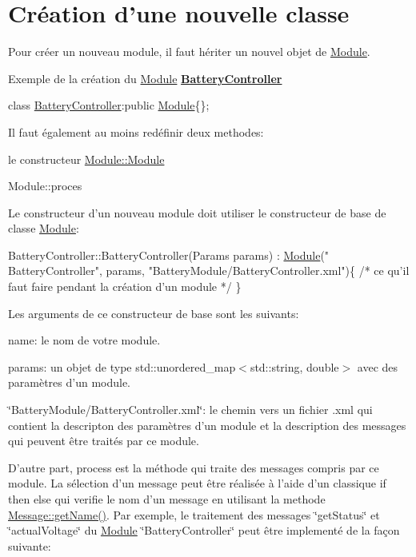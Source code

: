 \hypertarget{docModule_classCreation}{}\section{Création d'une nouvelle classe}\label{docModule_classCreation}
Pour créer un nouveau module, il faut hériter un nouvel objet de \hyperlink{classModule}{Module}.

Exemple de la création du \hyperlink{classModule}{Module} {\bfseries \hyperlink{classBatteryController}{Battery\-Controller}}

{\ttfamily class \hyperlink{classBatteryController}{Battery\-Controller}\-:public \hyperlink{classModule}{Module}\{\};}

Il faut également au moins redéfinir deux methodes\-:
\begin{DoxyEnumerate}
\item le constructeur \hyperlink{classModule_abcdd948c7444d3420f04be1bd332fbae}{Module\-::\-Module}
\item Module\-::proces
\end{DoxyEnumerate}

Le constructeur d'un nouveau module doit utiliser le constructeur de base de classe \hyperlink{classModule}{Module}\-:


\begin{DoxyCode}
BatteryController::BatteryController(Params params) : \hyperlink{classModule}{Module}(\textcolor{stringliteral}{"
      BatteryController"}, params, \textcolor{stringliteral}{"BatteryModule/BatteryController.xml"})\{
    \textcolor{comment}{/* ce qu'il faut faire pendant la création d'un module */}
\}
\end{DoxyCode}


Les arguments de ce constructeur de base sont les suivants\-:
\begin{DoxyEnumerate}
\item name\-: le nom de votre module.
\item params\-: un objet de type {\ttfamily std\-::unordered\-\_\-map$<$std\-::string, double$>$} avec des paramètres d'un module.
\item \char`\"{}\-Battery\-Module/\-Battery\-Controller.\-xml\char`\"{}\-: le chemin vers un fichier {\ttfamily .xml} qui contient la descripton des paramètres d'un module et la description des messages qui peuvent être traités par ce module.
\end{DoxyEnumerate}

D'autre part, process est la méthode qui traite des messages compris par ce module. La sélection d'un message peut être réalisée à l'aide d'un classique {\ttfamily if then else} qui verifie le nom d'un message en utilisant la methode \hyperlink{classMessage_ac03b02000572b0852c574498bf138e87}{Message\-::get\-Name()}. Par exemple, le traitement des messages \char`\"{}get\-Status\char`\"{} et \char`\"{}actual\-Voltage\char`\"{} du \hyperlink{classModule}{Module} \char`\"{}\-Battery\-Controller\char`\"{} peut être implementé de la façon suivante\-:


